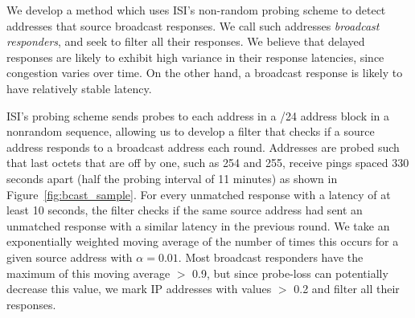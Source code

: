 %
We develop a method which uses ISI's non-random probing
scheme to detect addresses that source broadcast responses.
We call such addresses \emph{broadcast responders}, and seek to filter
all their responses.
%
We believe that delayed responses are likely to
exhibit high variance in their response latencies, since congestion varies over
time. 
%
On the other hand, a
broadcast response is likely to have relatively stable latency.
%

ISI's probing scheme sends
probes to each address in a /24 address block in a nonrandom sequence,
allowing us to develop a filter that checks if a source address responds
to a broadcast address each round.
%
Addresses are probed such that last octets that are off by one, such
as 254 and 255, receive pings spaced 330 seconds apart (half the
probing interval of 11 minutes) as shown in Figure~\ref{fig:bcast_sample}.
%
%
For every unmatched response with a latency of at least 10 seconds,
the filter checks if the same source address had sent an unmatched
response with a similar latency in the previous round.
%
We take an exponentially weighted moving average of the number of times
this occurs for a given source address with $\alpha=0.01$.
%
Most broadcast responders have the
maximum of this moving average $>$ 0.9, but since probe-loss can
potentially decrease this value, we mark IP addresses with values $>$
0.2 and filter all their responses. 
%

